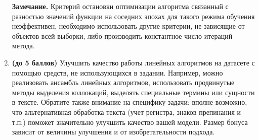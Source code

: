 \documentclass[10pt,fleqn]{article}
\begin{document}
\begin{enumerate}
\textbf{Замечание.} Критерий остановки оптимизации алгоритма связанный с разностью значений функции на соседних эпохах для такого режима обучения неэффективен, необходимо использовать другие критерии, не зависящие от объектов всей выборки, либо производить константное число итераций метода.

\item \textbf{(до 5 баллов)} Улучшить качество работы линейных алгоритмов на датасете с помощью средств, не использующихся в задании. Например, можно реализовать ансамбль линейных алгоритмов, использовать продвинутые методы выделения коллокаций, выделять специальные термины или сущности в тексте. Обратите также внимание на специфику задачи: вполне возможно, что альтернативная обработка текста (учет регистра, знаков препинания и т.п.) поможет значительно улучшить качество вашей модели. Размер бонуса зависит от величины улучшения и от изобретательности подхода.

\end{enumerate}
\end{document}
